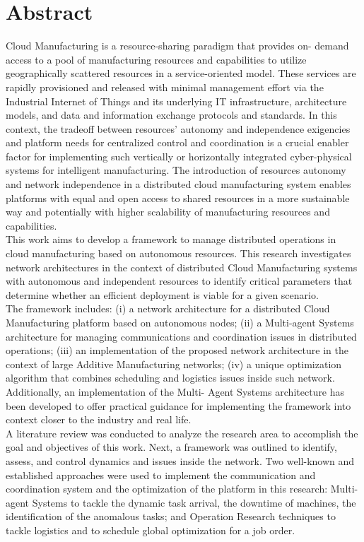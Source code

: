 \chapter*{Abstract}
Cloud Manufacturing is a resource-sharing paradigm that provides on- demand access to a pool of manufacturing resources and capabilities to utilize geographically scattered resources in a service-oriented model. These services are rapidly provisioned and released with minimal management effort via the Industrial Internet of Things and its underlying IT infrastructure, architecture models, and data and information exchange protocols and standards. In this context, the tradeoff between resources’ autonomy and independence exigencies and platform needs for centralized control and coordination is a crucial enabler factor for implementing such vertically or horizontally integrated cyber-physical systems for intelligent manufacturing. The introduction of resources autonomy and network independence in a distributed cloud manufacturing system enables platforms with equal and open access to shared resources in a more sustainable way and potentially with higher scalability of manufacturing resources and capabilities.\\
This work aims to develop a framework to manage distributed operations in cloud manufacturing based on autonomous resources. This research investigates network architectures in the context of distributed Cloud Manufacturing systems with autonomous and independent resources to identify critical parameters that determine whether an efficient deployment is viable for a given scenario.\\
The framework includes: (i) a network architecture for a distributed Cloud Manufacturing platform based on autonomous nodes; (ii) a Multi-agent Systems architecture for managing communications and coordination issues in distributed operations; (iii) an implementation of the proposed network architecture in the context of large Additive Manufacturing networks; (iv) a unique optimization algorithm that combines scheduling and logistics issues inside such network. Additionally, an implementation of the Multi- Agent Systems architecture has been developed to offer practical guidance for implementing the framework into context closer to the industry and real life.\\
A literature review was conducted to analyze the research area to accomplish the goal and objectives of this work. Next, a framework was outlined to identify, assess, and control dynamics and issues inside the network. Two well-known and established approaches were used to implement the communication and coordination system and the optimization of the platform in this research: Multi-agent Systems to tackle the dynamic task arrival, the downtime of machines, the identification of the anomalous tasks; and Operation Research techniques to tackle logistics and to schedule global optimization for a job order.\\
